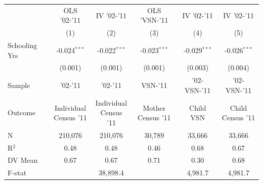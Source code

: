 
\begin{tabular}[t]{lccccc}
\toprule
  & OLS '02-'11 & IV '02-'11 & OLS 'VSN-'11 & IV '02-'11  & IV '02-'11  \\
  & (1) & (2) & (3) & (4) & (5)\\
\midrule
Schooling Yrs & -0.024$^{***}$ & -0.022$^{***}$ & -0.023$^{***}$ & -0.029$^{***}$ & -0.026$^{***}$\\
 & (0.001) & (0.001) & (0.001) & (0.003) & (0.004)\\
\midrule
Sample & '02-'11 & '02-'11 & VSN-'11 & '02-VSN-'11 & '02-VSN-'11 \\
Outcome & \makecell{Individual\\Census '11} & \makecell{Individual\\Census '11} & \makecell{Mother\\Census '11} & \makecell{Child\\VSN} & \makecell{Child\\Census '11} \\
\midrule
N & 210,076 & 210,076 & 30,789 & 33,666 & 33,666\\
R$^2$ & 0.48 & 0.48 & 0.46 & 0.68 & 0.67\\
DV Mean & 0.67 & 0.67 & 0.71 & 0.30 & 0.68\\
F-stat &  & 38,898.4 &  & 4,981.7 & 4,981.7\\
\bottomrule
\end{tabular}
